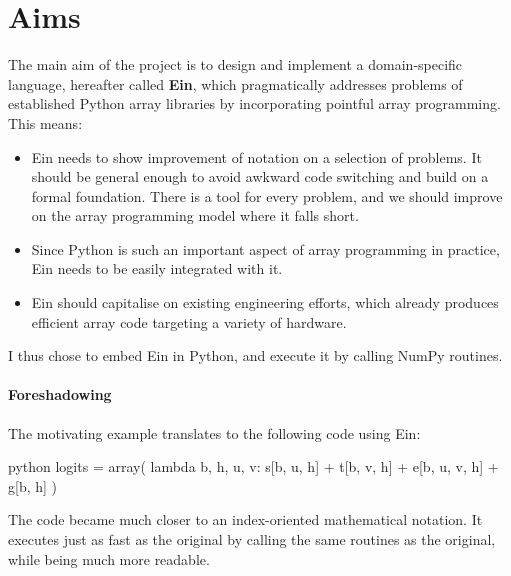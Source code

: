\section{Aims}

The main aim of the project is to design and implement a domain-specific language, hereafter called \textbf{Ein}, which pragmatically addresses problems of established Python array libraries by incorporating pointful array programming. This means:
\begin{itemize}
    \item Ein needs to show improvement of notation on a selection of problems. It should be general enough to avoid awkward code switching and build on a formal foundation. There is a tool for every problem, and we should improve on the array programming model where it falls short. 
    \item Since Python is such an important aspect of array programming in practice, Ein needs to be easily integrated with it. 
    \item Ein should capitalise on existing engineering efforts, which already produces efficient array code targeting a variety of hardware.
\end{itemize}
I thus chose to embed Ein in Python, and execute it by calling NumPy routines.

\vspace*{\fill}
\begin{tcolorbox}[colback=blue!5!white,colframe=blue!75!black]
\paragraph{Foreshadowing} The motivating example translates to the following code using Ein:

\begin{center}
\vspace{1em}
\begin{cminted}{python}
logits = array(
    lambda b, h, u, v: s[b, u, h] + t[b, v, h] + e[b, u, v, h] + g[b, h]
)
\end{cminted}
\end{center}

The code became much closer to an index-oriented mathematical notation. It executes just as fast as the original by calling the same routines as the original, while being much more readable.
\end{tcolorbox}
\vspace*{\fill}
